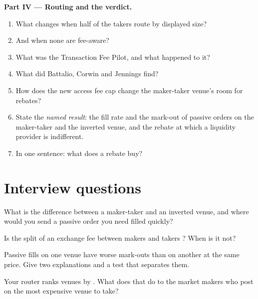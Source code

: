 \begin{problem}
\medskip\noindent\textbf{Part IV --- Routing and the verdict.}
\begin{enumerate}[resume]
\item What changes when half of the takers route by displayed size?
\item And when none are fee-aware?
\item What was the Transaction Fee Pilot, and what happened to it?
\item What did Battalio, Corwin and Jennings find?
\item How does the new access fee cap change the maker-taker venue's room for rebates?
\item State the \emph{named result}: the fill rate and the mark-out of passive orders on the maker-taker and the inverted venue, and the rebate at which a
liquidity provider is indifferent.
\item In one sentence: what does a rebate buy?
\end{enumerate}
\end{problem}

\section{Interview questions}

\begin{interviewq}\label{iq:mx:fees-rebates-and-venue-economics:1}
What is the difference between a maker-taker and an inverted venue, and where would you send a passive order you need filled quickly?
\end{interviewq}

\begin{interviewq}\label{iq:mx:fees-rebates-and-venue-economics:2}
Is the split of an exchange fee between makers and takers ? When is it not?
\end{interviewq}

\begin{interviewq}\label{iq:mx:fees-rebates-and-venue-economics:3}
Passive fills on one venue have worse mark-outs than on another at the same price. Give two explanations and a test that separates them.
\end{interviewq}

\begin{interviewq}\label{iq:mx:fees-rebates-and-venue-economics:4}
Your router ranks venues by . What does that do to the market makers who post on the most expensive venue to take?
\end{interviewq}

